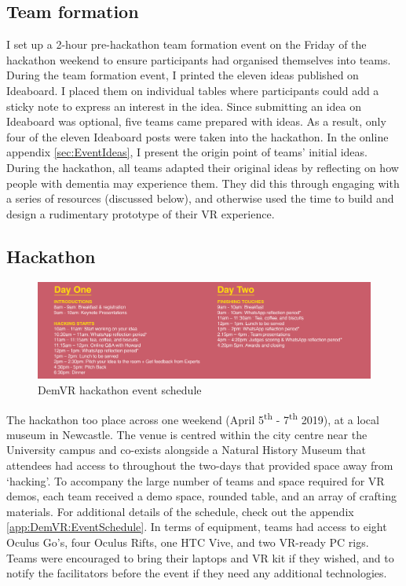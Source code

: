 \subsection{Team formation}
\label{sec:TeamFormation}
I set up a 2-hour pre-hackathon team formation event on the Friday of the hackathon weekend to ensure participants had organised themselves into teams. During the team formation event, I printed the eleven ideas published on Ideaboard. I placed them on individual tables where participants could add a sticky note to express an interest in the idea. Since submitting an idea on Ideaboard was optional, five teams came prepared with ideas. As a result, only four of the eleven Ideaboard posts were taken into the hackathon. In the online appendix \ref{sec:EventIdeas}, I present the origin point of teams’ initial ideas. During the hackathon, all teams adapted their original ideas by reflecting on how people with dementia may experience them. They did this through engaging with a series of resources (discussed below), and otherwise used the time to build and design a rudimentary prototype of their VR experience. 

\subsection{Hackathon}
\label{sec:HackathonEvent}
\begin{figure}[htp]
\centering
\includegraphics[width=1\linewidth]{Images/DemVR/DemVRHackathonSchedule.png}
\caption{DemVR hackathon event schedule}
\label{fig:schedule}
\end{figure}
The hackathon too place across one weekend (April 5\textsuperscript{th} - 7\textsuperscript{th} 2019), at a local museum in Newcastle. The venue is centred within the city centre near the University campus and co-exists alongside a Natural History Museum that attendees had access to throughout the two-days that provided space away from ‘hacking’. To accompany the large number of teams and space required for VR demos, each team received a demo space, rounded table, and an array of crafting materials. For additional details of the schedule, check out the appendix \ref{app:DemVR:EventSchedule}. In terms of equipment, teams had access to eight Oculus Go’s, four Oculus Rifts, one HTC Vive, and two VR-ready PC rigs. Teams were encouraged to bring their laptops and VR kit if they wished, and to notify the facilitators before the event if they need any additional technologies.

